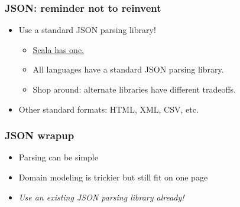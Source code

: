 %



\begin{frame}
  \frametitle{JSON: reminder not to reinvent}

  \begin{itemize}
    \item Use a standard JSON parsing library!
      \begin{itemize}
        \item \href{http://www.scala-lang.org/api/current/index.html\#scala.util.parsing.json.JSON$}{Scala has one.}
        \item All languages have a standard JSON parsing library.
        \item Shop around: alternate libraries have different tradeoffs.
      \end{itemize}
    \item Other standard formats: HTML, XML, CSV, etc.
  \end{itemize}
\end{frame}


\begin{frame}
  \frametitle{JSON wrapup}

  \begin{itemize}
    \item Parsing can be simple
    \item Domain modeling is trickier but still fit on one page
    \item \emph{Use an existing JSON parsing library already!} 
  \end{itemize}
\end{frame}

%

